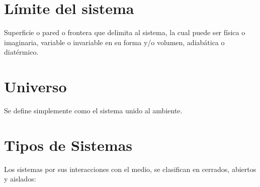 \documentclass[12pt,twocolumn,a4paper]{report}
\begin{document}
	\section*{Límite del sistema}
Superficie o pared o frontera que delimita al sistema, la cual puede ser física o imaginaria, variable o invariable en su forma y/o volumen, adiabática o diatérmico.

	\section*{Universo}
Se define simplemente como el sistema unido al  ambiente.

	\section*{Tipos de Sistemas}
Los sistemas por sus interacciones con el medio, se clasifican en cerrados, abiertos y aislados: 
\end{document}
